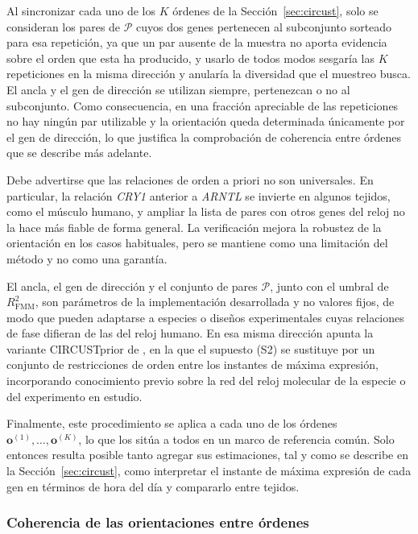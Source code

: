 \documentclass[12pt, a4paper]{report}
\begin{document}
Al sincronizar cada uno de los \(K\) órdenes de la Sección~\ref{sec:circust}, solo se consideran los pares de \(\mathcal{P}\) cuyos dos genes pertenecen al subconjunto sorteado para esa repetición, ya que un par ausente de la muestra no aporta evidencia sobre el orden que esta ha producido, y usarlo de todos modos sesgaría las \(K\) repeticiones en la misma dirección y anularía la diversidad que el muestreo busca. El ancla y el gen de dirección se utilizan siempre, pertenezcan o no al subconjunto. Como consecuencia, en una fracción apreciable de las repeticiones no hay ningún par utilizable y la orientación queda determinada únicamente por el gen de dirección, lo que justifica la comprobación de coherencia entre órdenes que se describe más adelante.

Debe advertirse que las relaciones de orden a priori no son universales. En particular, la relación \textit{CRY1} anterior a \textit{ARNTL} se invierte en algunos tejidos, como el músculo humano, y ampliar la lista de pares con otros genes del reloj no la hace más fiable de forma general. La verificación mejora la robustez de la orientación en los casos habituales, pero se mantiene como una limitación del método y no como una garantía.

El ancla, el gen de dirección y el conjunto de pares \(\mathcal{P}\), junto con el umbral de \(R^2_{\mathrm{FMM}}\), son parámetros de la implementación desarrollada y no valores fijos, de modo que pueden adaptarse a especies o diseños experimentales cuyas relaciones de fase difieran de las del reloj humano. En esa misma dirección apunta la variante CIRCUSTprior de \citet{larriba2023}, en la que el supuesto (S2) se sustituye por un conjunto de restricciones de orden entre los instantes de máxima expresión, incorporando conocimiento previo sobre la red del reloj molecular de la especie o del experimento en estudio.

Finalmente, este procedimiento se aplica a cada uno de los órdenes \(\mathbf{o}^{(1)},\ldots,\mathbf{o}^{(K)}\), lo que los sitúa a todos en un marco de referencia común. Solo entonces resulta posible tanto agregar sus estimaciones, tal y como se describe en la Sección~\ref{sec:circust}, como interpretar el instante de máxima expresión de cada gen en términos de hora del día y compararlo entre tejidos.

\subsubsection*{Coherencia de las orientaciones entre órdenes}
\end{document}
